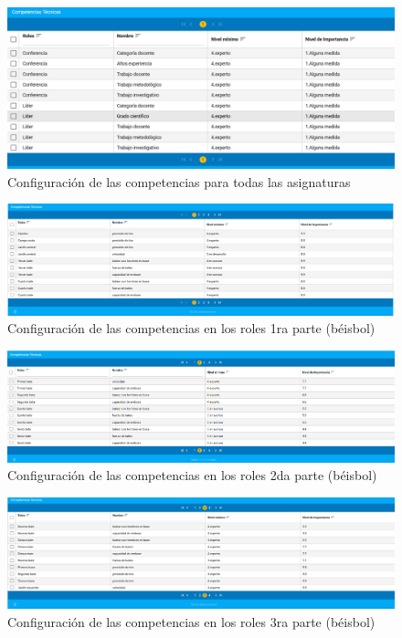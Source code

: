 {\begin{figure}[H]
	\centering
	\includegraphics[width=\textwidth]{figuras/conf-roles-comp-asignatura.png}
	\caption{Configuración de las competencias para todas las asignaturas} \label{fig:conf-roles-comp-asignatura}
\end{figure}

\begin{figure}[H]
	\centering
	\includegraphics[width=\textwidth]{figuras/beisbol_conf_comp_rol1.png}
	\caption{Configuración de las competencias en los roles 1ra parte (béisbol)} \label{fig:conf-roles-comp-pelota}
\end{figure}

\begin{figure}[H]
	\centering
	\includegraphics[width=\textwidth]{figuras/beisbol_conf_comp_rol2.png}
	\caption{Configuración de las competencias en los roles 2da parte (béisbol)} \label{fig:conf-roles-comp-pelota1}
\end{figure}

\begin{figure}[H]
	\centering
	\includegraphics[width=\textwidth]{figuras/beisbol_conf_comp_rol3.png}
	\caption{Configuración de las competencias en los roles 3ra parte (béisbol)} \label{fig:conf-roles-comp-pelota2}
\end{figure}


}
